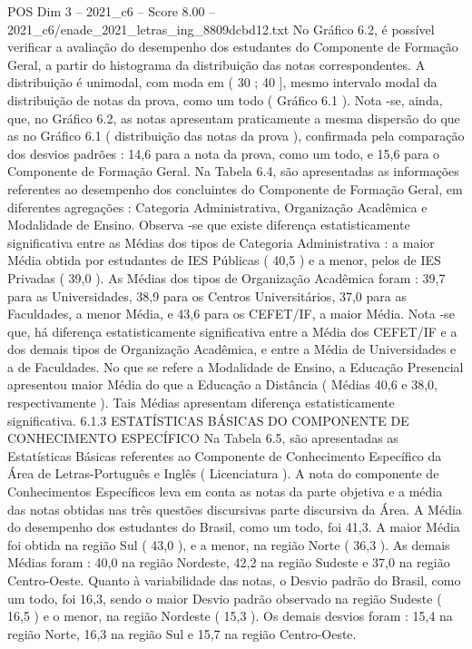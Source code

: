 \begin{textsample}{POS Dim 3 – 2021\_c6 – Score 8.00 – 2021\_c6/enade\_2021\_letras\_ing\_8809dcbd12.txt}
No Gráfico 6.2, é possível verificar a avaliação do desempenho dos estudantes do Componente de Formação Geral, a partir do histograma da distribuição das notas correspondentes.
A distribuição é unimodal, com moda em ( 30 ; 40 ], mesmo intervalo modal da distribuição de notas da prova, como um todo ( Gráfico 6.1 ).
Nota -se, ainda, que, no Gráfico 6.2, as notas apresentam praticamente a mesma dispersão do que as no Gráfico 6.1 ( distribuição das notas da prova ), confirmada pela comparação dos desvios padrões : 14,6 para a nota da prova, como um todo, e 15,6 para o Componente de Formação Geral.
Na Tabela 6.4, são apresentadas as informações referentes ao desempenho dos concluintes do Componente de Formação Geral, em diferentes agregações : Categoria Administrativa, Organização Acadêmica e Modalidade de Ensino.
Observa -se que existe diferença estatisticamente significativa entre as Médias dos tipos de Categoria Administrativa : a maior Média obtida por estudantes de IES Públicas ( 40,5 ) e a menor, pelos de IES Privadas ( 39,0 ).
As Médias dos tipos de Organização Acadêmica foram : 39,7 para as Universidades, 38,9 para os Centros Universitários, 37,0 para as Faculdades, a menor Média, e 43,6 para os CEFET/IF, a maior Média.
Nota -se que, há diferença estatisticamente significativa entre a Média dos CEFET/IF e a dos demais tipos de Organização Acadêmica, e entre a Média de Universidades e a de Faculdades.
No que se refere a Modalidade de Ensino, a Educação Presencial apresentou maior Média do que a Educação a Distância ( Médias 40,6 e 38,0, respectivamente ).
Tais Médias apresentam diferença estatisticamente significativa. 6.1.3 ESTATÍSTICAS BÁSICAS DO COMPONENTE DE CONHECIMENTO ESPECÍFICO Na Tabela 6.5, são apresentadas as Estatísticas Básicas referentes ao Componente de Conhecimento Específico da Área de Letras-Português e Inglês ( Licenciatura ).
A nota do componente de Conhecimentos Específicos leva em conta as notas da parte objetiva e a média das notas obtidas nas três questões discursivas parte discursiva da Área.
A Média do desempenho dos estudantes do Brasil, como um todo, foi 41,3.
A maior Média foi obtida na região Sul ( 43,0 ), e a menor, na região Norte ( 36,3 ).
As demais Médias foram : 40,0 na região Nordeste, 42,2 na região Sudeste e 37,0 na região Centro-Oeste.
Quanto à variabilidade das notas, o Desvio padrão do Brasil, como um todo, foi 16,3, sendo o maior Desvio padrão observado na região Sudeste ( 16,5 ) e o menor, na região Nordeste ( 15,3 ).
Os demais desvios foram : 15,4 na região Norte, 16,3 na região Sul e 15,7 na região Centro-Oeste.

\end{textsample}
